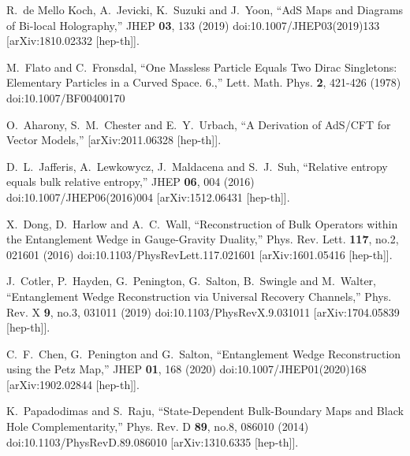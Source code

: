 \documentclass[a4paper,12pt]{article}
\begin{document}
\begin{thebibliography}{}
R.~de Mello Koch, A.~Jevicki, K.~Suzuki and J.~Yoon,
``AdS Maps and Diagrams of Bi-local Holography,''
JHEP \textbf{03}, 133 (2019)
doi:10.1007/JHEP03(2019)133
[arXiv:1810.02332 [hep-th]].

M.~Flato and C.~Fronsdal,
``One Massless Particle Equals Two Dirac Singletons: Elementary Particles in a Curved Space. 6.,''
Lett. Math. Phys. \textbf{2}, 421-426 (1978)
doi:10.1007/BF00400170

O.~Aharony, S.~M.~Chester and E.~Y.~Urbach,
``A Derivation of AdS/CFT for Vector Models,''
[arXiv:2011.06328 [hep-th]].

D.~L.~Jafferis, A.~Lewkowycz, J.~Maldacena and S.~J.~Suh,
``Relative entropy equals bulk relative entropy,''
JHEP \textbf{06}, 004 (2016)
doi:10.1007/JHEP06(2016)004
[arXiv:1512.06431 [hep-th]].

X.~Dong, D.~Harlow and A.~C.~Wall,
``Reconstruction of Bulk Operators within the Entanglement Wedge in Gauge-Gravity Duality,''
Phys. Rev. Lett. \textbf{117}, no.2, 021601 (2016)
doi:10.1103/PhysRevLett.117.021601
[arXiv:1601.05416 [hep-th]].

J.~Cotler, P.~Hayden, G.~Penington, G.~Salton, B.~Swingle and M.~Walter,
``Entanglement Wedge Reconstruction via Universal Recovery Channels,''
Phys. Rev. X \textbf{9}, no.3, 031011 (2019)
doi:10.1103/PhysRevX.9.031011
[arXiv:1704.05839 [hep-th]].

C.~F.~Chen, G.~Penington and G.~Salton,
``Entanglement Wedge Reconstruction using the Petz Map,''
JHEP \textbf{01}, 168 (2020)
doi:10.1007/JHEP01(2020)168
[arXiv:1902.02844 [hep-th]].

K.~Papadodimas and S.~Raju,
``State-Dependent Bulk-Boundary Maps and Black Hole Complementarity,''
Phys. Rev. D \textbf{89}, no.8, 086010 (2014)
doi:10.1103/PhysRevD.89.086010
[arXiv:1310.6335 [hep-th]].


\end{thebibliography}
\end{document}
